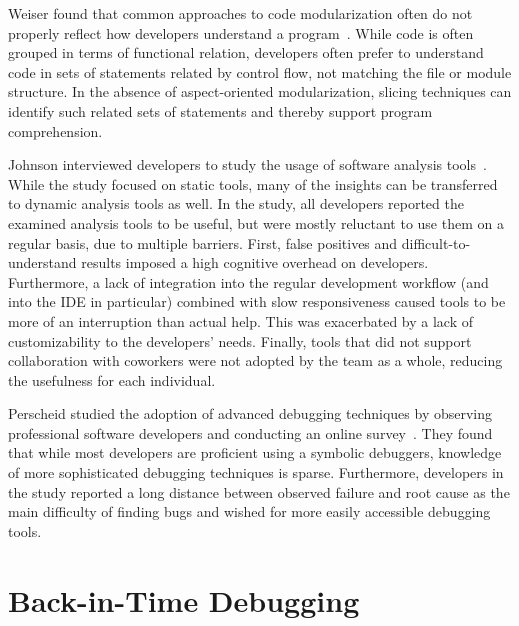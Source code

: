 Weiser found that common approaches to code modularization often do not properly reflect how developers understand a program~\cite{weiser82:programmers_use_slices_when}.
While code is often grouped in terms of functional relation, developers often prefer to understand code in sets of statements related by control flow, not matching the file or module structure.
In the absence of aspect-oriented modularization, slicing techniques can identify such related sets of statements and thereby support program comprehension.

Johnson \etal interviewed developers to study the usage of software analysis tools~\cite{johnson13:why_dont_software_developers}.
While the study focused on static tools, many of the insights can be transferred to dynamic analysis tools as well.
In the study, all developers reported the examined analysis tools to be useful, but were mostly reluctant to use them on a regular basis, due to multiple barriers.
First, false positives and difficult-to-understand results imposed a high cognitive overhead on developers.
Furthermore, a lack of integration into the regular development workflow (and into the IDE in particular) combined with slow responsiveness caused tools to be more of an interruption than actual help.
This was exacerbated by a lack of customizability to the developers' needs.
Finally, tools that did not support collaboration with coworkers were not adopted by the team as a whole, reducing the usefulness for each individual.

Perscheid \etal studied the adoption of advanced debugging techniques by observing professional software developers and conducting an online survey~\cite{perscheid17:studying_the_advancement}.
They found that while most developers are proficient using a symbolic debuggers, knowledge of more sophisticated debugging techniques is sparse.
Furthermore, developers in the study reported a long distance between observed failure and root cause as the main difficulty of finding bugs and wished for more easily accessible debugging tools.

\section{Back-in-Time Debugging}
\label{sec:rw_bit_debugging}


